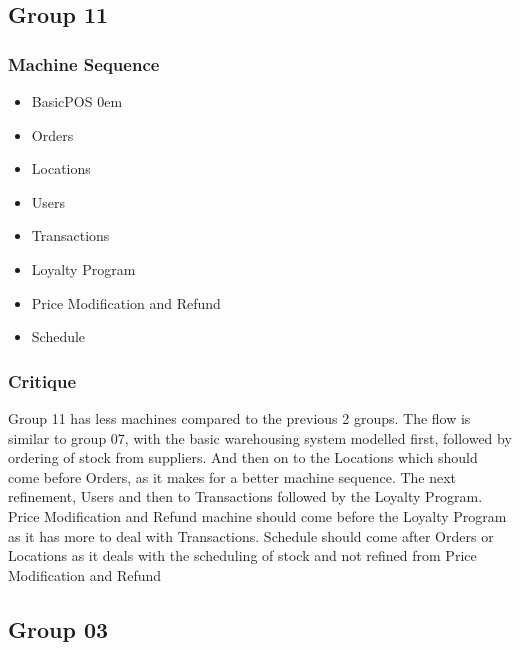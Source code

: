 \subsection{Group 11}
\label{group11}

\subsubsection{Machine Sequence}
\label{machinesequence}

\begin{itemize}
\item BasicPOS
 \itemsep0em 

\item Orders

\item Locations

\item Users

\item Transactions

\item Loyalty Program

\item Price Modification and Refund

\item Schedule

\end{itemize}

\subsubsection{Critique}
\label{critique}

Group 11 has less machines compared to the previous 2 groups. The flow is similar to group 07, with the basic warehousing system modelled first, followed by ordering of stock from suppliers. And then on to the Locations which should come before Orders, as it makes for a better machine sequence. The next refinement, Users and then to Transactions followed by the Loyalty Program. Price Modification and Refund machine should come before the Loyalty Program as it has more to deal with Transactions. Schedule should come after Orders or Locations as it deals with the scheduling of stock and not refined from Price Modification and Refund

\subsection{Group 03}
\label{group03}

